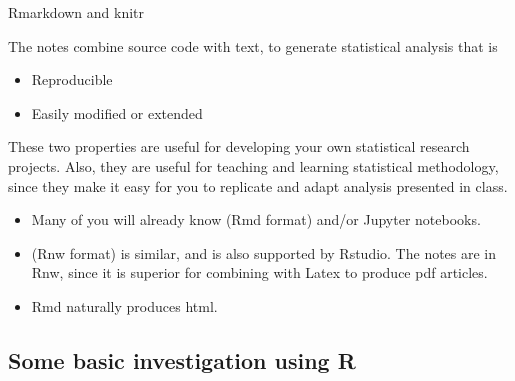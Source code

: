 \begin{frame}{Rmarkdown and knitr}

The notes combine source code with text, to generate statistical analysis that is 
\begin{itemize}
\item Reproducible
\item Easily modified or extended
\end{itemize}
These two properties are useful for developing your own statistical research projects. Also, they are useful for teaching and learning statistical methodology, since they make it easy for you to replicate and adapt analysis presented in class.


\begin{itemize}
\item Many of you will already know  (Rmd format) and/or Jupyter notebooks.
\item {} (Rnw format) is similar, and is also supported by Rstudio. The notes are in Rnw, since it is superior for combining with Latex to produce pdf articles.
\item Rmd naturally produces html.
\end{itemize}

\end{frame}

\subsection{Some basic investigation using R}

